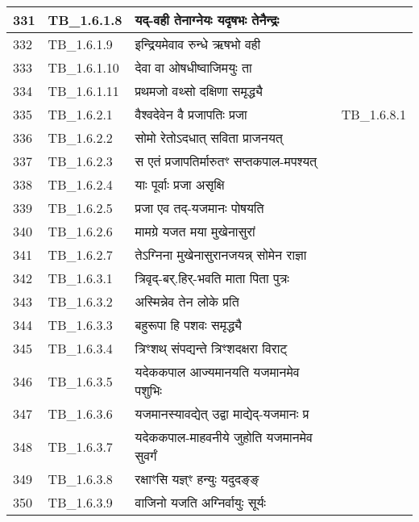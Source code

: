 \documentclass[17pt]{extarticle}
\begin{document}
\begin{longtable}{||p{0.4in}||p{0.9in}||p{4.0in}||p{0.9in}||}
        \hline
            331 & TB\_1.6.1.8 & यद्{-}वही तेनाग्नेयः यदृषभः तेनैन्द्रः &      \\
        \hline
            332 & TB\_1.6.1.9 & इन्द्रियमेवाव रुन्धे ऋषभो वही &      \\
        \hline
            333 & TB\_1.6.1.10 & देवा वा ओषधीष्वाजिमयुः ता &      \\
        \hline
            334 & TB\_1.6.1.11 & प्रथमजो वथ्सो दक्षिणा समृद्ध्यै &      \\
        \hline
            335 & TB\_1.6.2.1 & वैश्वदेवेन वै प्रजापतिः प्रजा &  TB\_1.6.8.1       \\
        \hline
            336 & TB\_1.6.2.2 & सोमो रेतोऽदधात् सविता प्राजनयत् &      \\
        \hline
            337 & TB\_1.6.2.3 & स एतं प्रजापतिर्मारुतꣳ सप्तकपाल{-}मपश्यत् &      \\
        \hline
            338 & TB\_1.6.2.4 & याः पूर्वाः प्रजा असृक्षि &      \\
        \hline
            339 & TB\_1.6.2.5 & प्रजा एव तद्{-}यजमानः पोषयति &      \\
        \hline
            340 & TB\_1.6.2.6 & मामग्रे यजत मया मुखेनासुरां &      \\
        \hline
            341 & TB\_1.6.2.7 & तेऽग्निना मुखेनासुरानजयन्न् सोमेन राज्ञा &      \\
        \hline
            342 & TB\_1.6.3.1 & त्रिवृद्{-}बर्.हिर्{-}भवति माता पिता पुत्रः &      \\
        \hline
            343 & TB\_1.6.3.2 & अस्मिन्नेव तेन लोके प्रति &      \\
        \hline
            344 & TB\_1.6.3.3 & बहुरूपा हि पशवः समृद्ध्यै &      \\
        \hline
            345 & TB\_1.6.3.4 & त्रिꣳशथ् संपद्यन्ते त्रिꣳशदक्षरा विराट् &      \\
        \hline
            346 & TB\_1.6.3.5 & यदेककपाल आज्यमानयति यजमानमेव पशुभिः &      \\
        \hline
            347 & TB\_1.6.3.6 & यजमानस्यावद्येत् उद्वा माद्येद्{-}यजमानः प्र &      \\
        \hline
            348 & TB\_1.6.3.7 & यदेककपाल{-}माहवनीये जुहोति यजमानमेव सुवर्गं &      \\
        \hline
            349 & TB\_1.6.3.8 & रक्षाꣳसि यज्ञ्ꣳ हन्युः यदुदङ्ङ् &      \\
        \hline
            350 & TB\_1.6.3.9 & वाजिनो यजति अग्निर्वायुः सूर्यः &      \\

\end{longtable}
\end{document}
